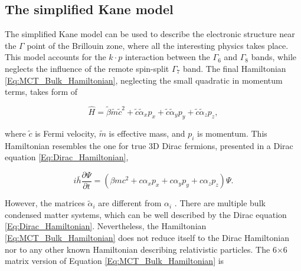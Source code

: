 \documentclass[titlepage,a4paper]{book}
\newcommand{\wciecie}{\quad\phantom{v}}
\begin{document}

\subsection{The simplified Kane model}
\wciecie
The simplified Kane model \cite{Kane_MCT}\cite{Kane_Model} can be used to describe the electronic structure near the $\Gamma$ point of the Brillouin zone, where all the interesting physics takes place. This model accounts for the $k\cdot p$ interaction between the $\Gamma_6$ and $\Gamma_8$ bands, while neglects the influence of the remote spin-split $\Gamma_7$ band. The final Hamiltonian \ref{Eq:MCT_Bulk_Hamiltonian}, neglecting the small quadratic in momentum terms, takes form of

\begin{equation}
\label{Eq:MCT_Bulk_Hamiltonian}
\hat{H} = \tilde{\beta} \tilde{m}\tilde{c}^2 + \tilde{c}\tilde{\alpha}_x p_x + \tilde{c}\tilde{\alpha}_y p_y + \tilde{c}\tilde{\alpha}_z p_z ,
\end{equation}

where $\tilde{c}$ is Fermi velocity, $\tilde{m}$ is effective mass, and $p_i$ is momentum. This Hamiltonian resembles the one for true 3D Dirac fermions, presented in a Dirac equation \ref{Eq:Dirac_Hamiltonian}, 

\begin{equation}
\label{Eq:Dirac_Hamiltonian}
i\bar{h} \frac{\partial \Psi}{\partial t} = \left( \beta mc^2 + c\alpha_x p_x + c\alpha_y p_y + c\alpha_z p_z \right) \Psi.
\end{equation}

However, the matrices $\tilde{\alpha}_i$ are different from $\alpha_i$ \cite{Teppe_MCT}. There are multiple bulk condensed matter systems, which can be well described by the Dirac equation \ref{Eq:Dirac_Hamiltonian}. Nevertheless, the Hamiltonian \ref{Eq:MCT_Bulk_Hamiltonian} does not reduce itself to the Dirac Hamiltonian nor to any other known Hamiltonian describing relativistic particles. The 6$\times$6 matrix version of Equation \ref{Eq:MCT_Bulk_Hamiltonian} is
\end{document}
